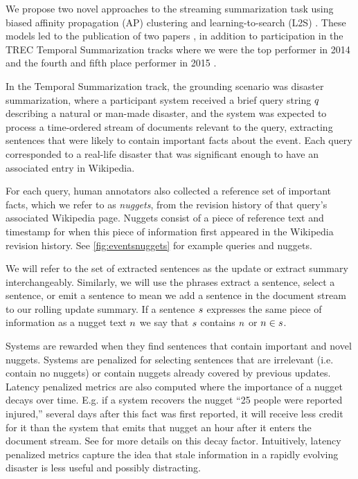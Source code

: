 We propose two novel approaches to the streaming summarization task
using biased affinity propagation (AP) clustering \citep{frey2007clustering}
and learning-to-search (L2S) \citep{daume2009search,chang2015learning}.
These models led to the publication of two papers 
\citep{kedzie2015predicting,kedzie2016real}, in addition to participation 
in the TREC Temporal Summarization tracks where we were the top performer in
2014 and the fourth and fifth place performer in 2015 
\citep{aslam2015trec,aslam2016trec}. 

In the Temporal Summarization track, the grounding scenario was disaster
summarization, where a participant system received a brief query string 
$q$ describing a natural or man-made disaster, and the system was 
expected to process a time-ordered stream of documents relevant to the query, 
extracting sentences that were likely to contain important facts about the
event. Each query corresponded to a real-life disaster that was significant
enough to have an associated entry in Wikipedia.

For each query, human annotators also collected a reference set of important 
facts, which we refer to as \textit{nuggets}, 
from the revision history of that query's associated Wikipedia page. 
Nuggets consist of a piece of reference text and timestamp for when this piece
of information first appeared in the Wikipedia revision history. 
See \autoref{fig:eventsnuggets} for example queries and nuggets.



We will refer to the set of extracted sentences as the update or extract
summary interchangeably. Similarly, we will use the phrases extract a sentence,
select a sentence, or emit a sentence to mean we add a sentence in the 
document stream to our rolling update summary. If a sentence $s$ 
expresses the same piece of information as a nugget text $n$ 
we say that $s$ contains $n$ or $n \in s$.

Systems are rewarded when they find sentences that contain important and novel
nuggets. Systems are penalized for 
selecting sentences that are irrelevant (i.e. contain no nuggets) or 
contain nuggets already covered by previous updates. 
Latency penalized metrics are also computed where
the importance of a nugget decays over time. E.g. if a system
recovers the nugget ``25 people were reported injured,'' several days
after this fact was first reported, it will receive less credit for it
than the system that emits that nugget an hour after it enters the 
document stream. See \cite{aslam2014trec} for more details on this decay 
factor. Intuitively, latency penalized metrics capture the idea that stale
information in a rapidly evolving disaster is less useful and possibly
distracting.


